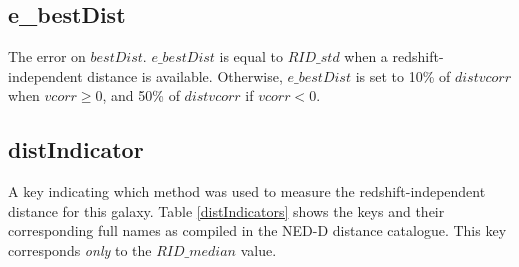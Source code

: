 \documentclass[twocolumn,tighten]{aastex62}
\begin{document}
\subsection{e\_bestDist} \label{e_bestDist}
The error on $bestDist$. $e\_bestDist$ is equal to $RID\_std$ when a redshift-independent distance is available. Otherwise, $e\_bestDist$ is set to 10\% of $distvcorr$ when $vcorr \geq 0$, and 50\% of $distvcorr$ if $vcorr < 0$.


\subsection{distIndicator} \label{distIndicator}
A key indicating which method was used to measure the redshift-independent distance for this galaxy. Table \ref{distIndicators} shows the keys and their corresponding full names as compiled in the NED-D distance catalogue. This key corresponds \textit{only} to the $RID\_median$ value.
\end{document}
